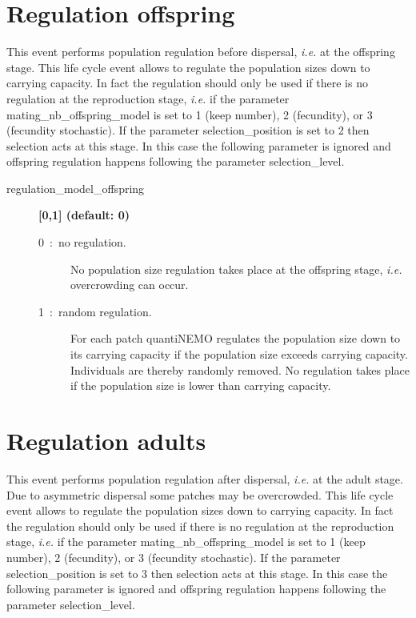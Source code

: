 \documentclass[letterpaper,12pt,oneside]{book}
\begin{document}
\section{Regulation offspring}\label{5regulation}
This event performs population regulation before dispersal, \textit{i.e.} at the offspring stage. This life cycle event allows to regulate the population sizes down to carrying capacity. In fact the regulation should only be used if there is no regulation at the reproduction stage, \textit{i.e.} if the parameter \textsf{mating\_nb\_offspring\_model} is set to 1 (keep number), 2 (fecundity), or 3 (fecundity stochastic). If the parameter \textsf{selection\_position} is set to 2 then selection acts at this stage. In this case the following parameter is ignored and offspring regulation happens following the parameter \textsf{selection\_level}.  
\begin{description}
\item[regulation\_model\_offspring] \textbf{[0,1] (default: 0)}
\begin{description}
\item[0~:~no regulation.] No population size regulation takes place at the offspring stage, \textit{i.e.} overcrowding can occur.
\item[1~:~random regulation.] For each patch quantiNEMO regulates the population size down to its carrying capacity if the population size exceeds carrying capacity. Individuals are thereby randomly removed. No regulation takes place if the population size is lower than carrying capacity.
\end{description}
\end{description}



\section{Regulation adults}\label{7regulation}
This event performs population regulation after dispersal, \textit{i.e.} at the adult stage. Due to asymmetric dispersal some patches may be overcrowded. This life cycle event allows to regulate the population sizes down to carrying capacity. In fact the regulation should only be used if there is no regulation at the reproduction stage, \textit{i.e.} if the parameter \textsf{mating\_nb\_offspring\_model} is set to 1 (keep number), 2 (fecundity), or 3 (fecundity stochastic). If the parameter \textsf{selection\_position} is set to 3 then selection acts at this stage. In this case the following parameter is ignored and offspring regulation happens following the parameter \textsf{selection\_level}.  
\end{document}
